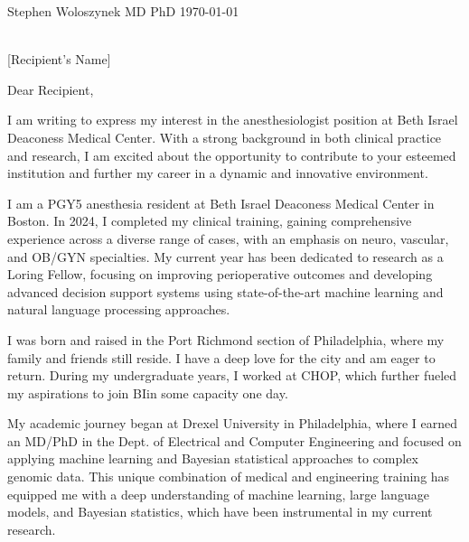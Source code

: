 \documentclass[12pt]{letter}
\newcommand{\recip}{Recipient}
\newcommand{\dept}{Dept. of Anesthesia}
\newcommand{\hosp}{Beth Israel Deaconess Medical Center}
\newcommand{\hospshort}{BI}
\newcommand{\addr}{330 Brookline Ave \\ Boston, MA 02215}
\begin{document}
\date{}

\begin{letter}{
\normalsize{Stephen Woloszynek MD PhD} \hfill \normalsize{\today} \\
\vspace{.1cm}
\fontsize{8.5}{10}\selectfont{
235 Old Colony Ave. Unit 224 \\
Boston, MA, 02127 \\
(215) 910-0152 \\
stephenwoloszynek@gmail.com} \\

\vspace{1cm}

\normalsize{[Recipient's Name]} \\
\vspace{.1cm}
\fontsize{8.5}{10}\selectfont{\dept \\
\hosp \\
\addr}
}

\opening{Dear \recip,}
\vspace{.2cm}
I am writing to express my interest in the anesthesiologist position at \hosp. With a strong background in both clinical practice and research, I am excited about the opportunity to contribute to your esteemed institution and further my career in a dynamic and innovative environment.

I am a PGY5 anesthesia resident at Beth Israel Deaconess Medical Center in Boston. In 2024, I completed my clinical training, gaining comprehensive experience across a diverse range of cases, with an emphasis on neuro, vascular, and OB/GYN specialties. My current year has been dedicated to research as a Loring Fellow, focusing on improving perioperative outcomes and developing advanced decision support systems using state-of-the-art machine learning and natural language processing approaches.

I was born and raised in the Port Richmond section of Philadelphia, where my family and friends still reside. I have a deep love for the city and am eager to return. During my undergraduate years, I worked at CHOP, which further fueled my aspirations to join \hospshort in some capacity one day.

My academic journey began at Drexel University in Philadelphia, where I earned an MD/PhD in the Dept. of Electrical and Computer Engineering and focused on applying machine learning and Bayesian statistical approaches to complex genomic data. This unique combination of medical and engineering training has equipped me with a deep understanding of machine learning, large language models, and Bayesian statistics, which have been instrumental in my current research. 


\end{letter}
\end{document}

